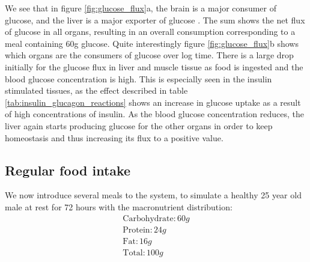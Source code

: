 \documentclass{IEEEtran}
\begin{document}

We see that in figure \ref{fig:glucose_flux}a, the brain is a major consumer of glucose, and the liver is a major exporter of glucose  \cite{miesfeld_mcevoy_2017}. The sum shows the net flux of glucose in all organs, resulting in an overall consumption corresponding to a meal containing 60g glucose. Quite interestingly figure \ref{fig:glucose_flux}b shows which organs are the consumers of glucose over log time. There is a large drop initially for the glucose flux in liver and muscle tissue as food is ingested and the blood glucose concentration is high. This is especially seen in the insulin stimulated tissues, as the effect described in table \ref{tab:insulin_glucagon_reactions} shows an increase in glucose uptake as a result of high concentrations of insulin. As the blood glucose concentration reduces, the liver again starts producing glucose for the other organs in order to keep homeostasis and thus increasing its flux to a positive value.


\subsection{Regular food intake}
We now introduce several meals to the system, to simulate a healthy 25 year old male at rest for 72 hours with the macronutrient distribution: \\
\begin{equation*}
\begin{split}
    \text{Carbohydrate}: 60 g \\
    \text{Protein}: 24 g \\
    \text{Fat}: 16 g \\ \hline
    \text{Total}: 100g
\end{split}
\end{equation*}
\end{document}
